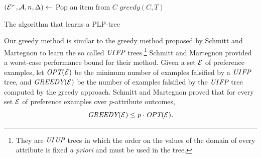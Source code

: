 \begin{algorithm}[ht]
	$(\mathcal{E}^\succ,\mathcal{A},n,\Delta) \leftarrow$ Pop an item from $C$\;
	$\mathit{greedy}(C,T)$\;

\caption{The  algorithm that learns a PLP-tree \label{alg:recur_learn}}
\end{algorithm}

Our greedy method is similar to the greedy method proposed by Schmitt and 
Martegnon \cite{schmitt2006complexity} to learn the so called $\textit{UI}$$\textit{FP}$ 
trees.\footnote{They are $\textit{UI}$$\textit{UP}$ trees in which the order on the
values of the domain of every attribute is fixed \emph{a priori} and must
be used in the tree.} Schmitt and Martegnon provided a worst-case performance 
bound for their method. Given a set $\mathcal{E}$ of preference examples, let 
$\textit{OPT}(\mathcal{E})$ be the minimum number of examples falsified by a $\textit{UI}$$\textit{FP}$ 
tree, and $\textit{GREEDY}(\mathcal{E})$ be the number of examples falsified by the 
$\textit{UI}$$\textit{FP}$ tree computed by the greedy approach. Schmitt and Martegnon 
proved that for every set $\mathcal{E}$ of preference examples over $p$-attribute 
outcomes,
\[
\textit{GREEDY}(\mathcal{E}) \leq p \cdot \textit{OPT}(\mathcal{E}). 
\]

